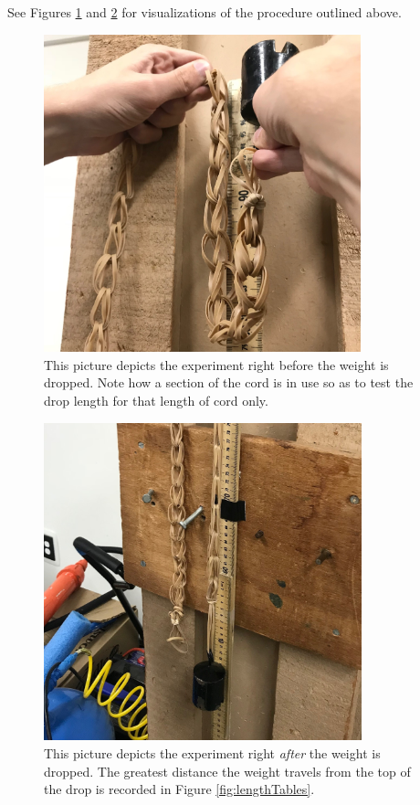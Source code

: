 \documentclass[12pt]{article}
\begin{document}
See Figures \ref{fig:lengthExpPreDrop} and \ref{fig:lengthExpPostDrop} for visualizations of the procedure outlined above.

\begin{figure}[h]
    \centering
    \includegraphics[height=9.2cm]{lengthExperimentPreDrop}
    \caption{This picture depicts the experiment right before the weight is dropped. Note how a section of the cord is in use so as to test the drop length for that length of cord only.}
    \label{fig:lengthExpPreDrop}
\end{figure}

\begin{figure}[h!]
    \centering
    \includegraphics[height=9.2cm]{lengthExperimentPostDrop}
    \caption{This picture depicts the experiment right \textit{after} the weight is dropped. The greatest distance the weight travels from the top of the drop is recorded in Figure \ref{fig:lengthTables}.}
    \label{fig:lengthExpPostDrop}
\end{figure}
\newpage
\end{document}
